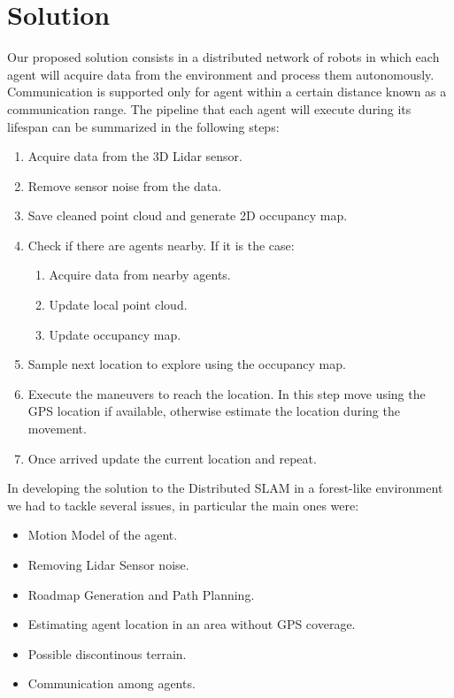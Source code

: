 \documentclass[twocolumn, a4paper]{article}
\begin{document}
\section{Solution}
\label{sec:Solution}
Our proposed solution consists in a distributed network of robots in which
each agent will acquire data from the environment and process them
autonomously. Communication is supported only for agent within a certain
distance known as a communication range.
The pipeline that each agent will execute during its lifespan can be summarized
in the following steps:
\begin{enumerate}
    \item Acquire data from the 3D Lidar sensor.
    \item Remove sensor noise from the data.
    \item Save cleaned point cloud and generate 2D occupancy map.
    \item Check if there are agents nearby. If it is the case:
        \begin{enumerate}
                \item Acquire data from nearby agents.
                \item Update local point cloud.
                \item Update occupancy map.
        \end{enumerate}
    \item Sample next location to explore using the occupancy map.
    \item Execute the maneuvers to reach the location. In this step move
          using the GPS location if available, otherwise estimate the
          location during the movement.
    \item Once arrived update the current location and repeat.
\end{enumerate}

In developing the solution to the Distributed SLAM in a forest-like
environment we had to tackle several issues, in particular the main ones
were:
\begin{itemize}
        \item Motion Model of the agent. %
        \item Removing Lidar Sensor noise. %
        \item Roadmap Generation and Path Planning.
        \item Estimating agent location in an area without GPS coverage.%
        \item Possible discontinous terrain. %
        \item Communication among agents.
\end{itemize}
\end{document}
